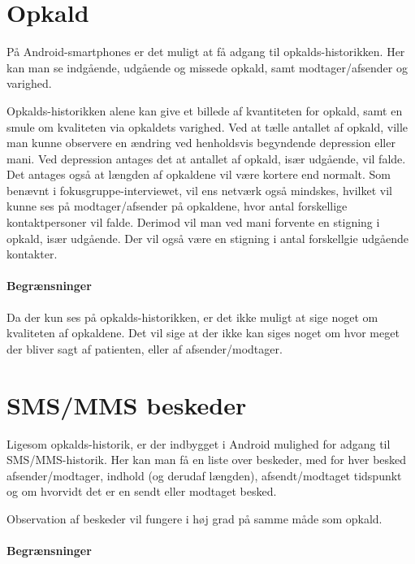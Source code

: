 \section{Opkald}
På Android-smartphones er det muligt at få adgang til opkalds-historikken.
Her kan man se indgående, udgående og missede opkald, samt modtager/afsender og varighed.

Opkalds-historikken alene kan give et billede af kvantiteten for opkald, samt en smule om kvaliteten via opkaldets varighed.
Ved at tælle antallet af opkald, ville man kunne observere en ændring ved henholdsvis begyndende depression eller mani.
Ved depression antages det at antallet af opkald, især udgående, vil falde.
Det antages også at længden af opkaldene vil være kortere end normalt.
Som benævnt i fokusgruppe-interviewet, vil ens netværk også mindskes, hvilket vil kunne ses på modtager/afsender på opkaldene, hvor antal forskellige kontaktpersoner vil falde.
Derimod vil man ved mani forvente en stigning i opkald, især udgående.
Der vil også være en stigning i antal forskellgie udgående kontakter.

\paragraph{Begrænsninger}
Da der kun ses på opkalds-historikken, er det ikke muligt at sige noget om kvaliteten af opkaldene.
Det vil sige at der ikke kan siges noget om hvor meget der bliver sagt af patienten, eller af afsender/modtager.

\section{SMS/MMS beskeder}
Ligesom opkalds-historik, er der indbygget i Android mulighed for adgang til SMS/MMS-historik.
Her kan man få en liste over beskeder, med for hver besked afsender/modtager, indhold (og derudaf længden), afsendt/modtaget tidspunkt og om hvorvidt det er en sendt eller modtaget besked.

Observation af beskeder vil fungere i høj grad på samme måde som opkald.

\paragraph{Begrænsninger}


